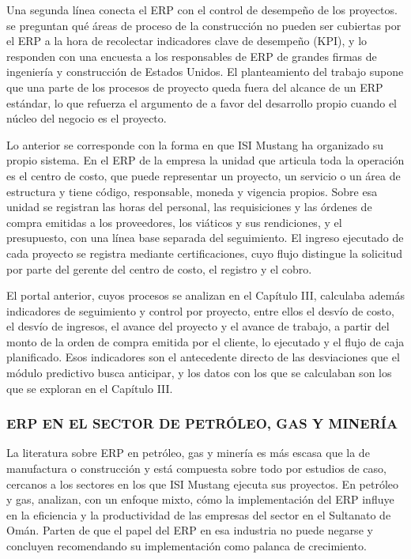 Una segunda línea conecta el ERP con el control de desempeño de los proyectos. \textcite{Skibniewski2009} se preguntan qué áreas de proceso de la construcción no pueden ser cubiertas por el ERP a la hora de recolectar indicadores clave de desempeño (KPI), y lo responden con una encuesta a los responsables de ERP de grandes firmas de ingeniería y construcción de Estados Unidos. El planteamiento del trabajo supone que una parte de los procesos de proyecto queda fuera del alcance de un ERP estándar, lo que refuerza el argumento de \textcite{Olsen2007} a favor del desarrollo propio cuando el núcleo del negocio es el proyecto.

Lo anterior se corresponde con la forma en que ISI Mustang ha organizado su propio sistema. En el ERP de la empresa la unidad que articula toda la operación es el centro de costo, que puede representar un proyecto, un servicio o un área de estructura y tiene código, responsable, moneda y vigencia propios. Sobre esa unidad se registran las horas del personal, las requisiciones y las órdenes de compra emitidas a los proveedores, los viáticos y sus rendiciones, y el presupuesto, con una línea base separada del seguimiento. El ingreso ejecutado de cada proyecto se registra mediante certificaciones, cuyo flujo distingue la solicitud por parte del gerente del centro de costo, el registro y el cobro.

El portal anterior, cuyos procesos se analizan en el Capítulo III, calculaba además indicadores de seguimiento y control por proyecto, entre ellos el desvío de costo, el desvío de ingresos, el avance del proyecto y el avance de trabajo, a partir del monto de la orden de compra emitida por el cliente, lo ejecutado y el flujo de caja planificado. Esos indicadores son el antecedente directo de las desviaciones que el módulo predictivo busca anticipar, y los datos con los que se calculaban son los que se exploran en el Capítulo III\@.

\subsubsection{ERP EN EL SECTOR DE PETRÓLEO, GAS Y MINERÍA}

La literatura sobre ERP en petróleo, gas y minería es más escasa que la de manufactura o construcción y está compuesta sobre todo por estudios de caso, cercanos a los sectores en los que ISI Mustang ejecuta sus proyectos. En petróleo y gas, \textcite{AlJafari2018} analizan, con un enfoque mixto, cómo la implementación del ERP influye en la eficiencia y la productividad de las empresas del sector en el Sultanato de Omán. Parten de que el papel del ERP en esa industria no puede negarse y concluyen recomendando su implementación como palanca de crecimiento.

